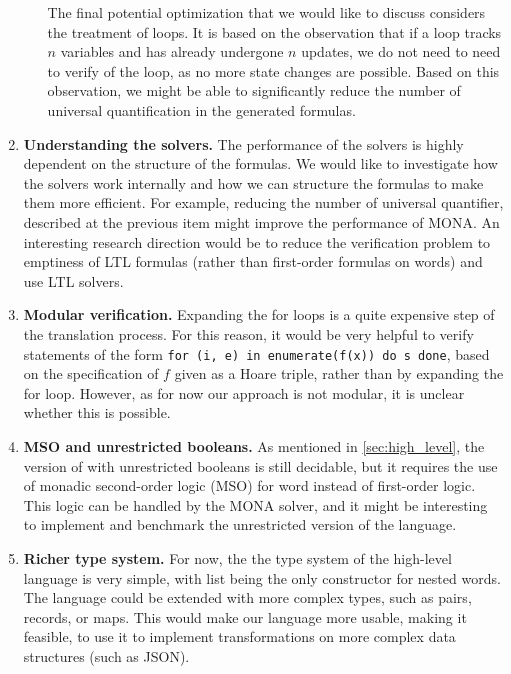 \begin{enumerate}
\begin{enumerate}
        The final potential optimization that we would like to discuss considers the treatment of loops. It is based on the observation that 
        if a loop tracks $n$ variables and has already undergone $n$ updates, we do not need to need to verify  of the loop, 
        as no more state changes are possible. Based on this observation, we might be able to significantly reduce the number of universal 
        quantification in the generated formulas.
    \end{enumerate}

    \item \textbf{Understanding the solvers.} The performance of the solvers is highly dependent on the structure of the formulas.
    We would like to investigate how the solvers work internally and how we can structure the formulas to make them more efficient.
    For example, reducing the number of universal quantifier, described at the previous item might improve the performance of MONA.
    An interesting research direction would be to reduce the verification problem to emptiness of LTL formulas (rather than first-order formulas on
    words) and use LTL solvers.

    \item \textbf{Modular verification.} Expanding the for loops is a quite expensive step of the translation process. For this reason,
     it would be very helpful to verify statements of the form \texttt{for (i, e) in enumerate(f(x)) do s done}, based on the 
     specification of $f$ given as a Hoare triple, rather than by expanding the for loop. However, as for now our approach is not 
     modular, it is unclear whether this is possible. 

    \item \textbf{MSO and unrestricted booleans.} As mentioned in \cref{sec:high_level}, the version of 
    with unrestricted booleans is still decidable, but it requires the use of monadic second-order logic (MSO) for word
    instead of first-order logic. This logic can be handled by the MONA solver, and it might be interesting to implement and 
    benchmark the unrestricted version of the language.

    \item \textbf{Richer type system.} For now, the the type system of the high-level language is very simple,
    with list being the only constructor for nested words. The language could be extended with more complex types, 
    such as pairs, records, or maps. This would make our language more usable, making it feasible, to use it 
    to implement transformations on more complex data structures (such as JSON).
    

\end{enumerate}
